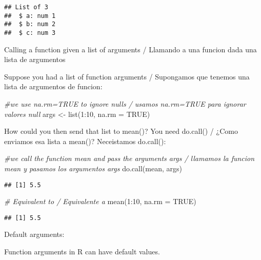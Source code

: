 \documentclass[
]{article}
\newenvironment{Shaded}{\begin{snugshade}}{\end{snugshade}}
\newcommand{\AttributeTok}[1]{\textcolor[rgb]{0.77,0.63,0.00}{#1}}
\newcommand{\CommentTok}[1]{\textcolor[rgb]{0.56,0.35,0.01}{\textit{#1}}}
\newcommand{\ConstantTok}[1]{\textcolor[rgb]{0.00,0.00,0.00}{#1}}
\newcommand{\DecValTok}[1]{\textcolor[rgb]{0.00,0.00,0.81}{#1}}
\newcommand{\FunctionTok}[1]{\textcolor[rgb]{0.00,0.00,0.00}{#1}}
\newcommand{\NormalTok}[1]{#1}
\newcommand{\OtherTok}[1]{\textcolor[rgb]{0.56,0.35,0.01}{#1}}
\newcommand{\SpecialCharTok}[1]{\textcolor[rgb]{0.00,0.00,0.00}{#1}}
\begin{document}
\begin{verbatim}
## List of 3
##  $ a: num 1
##  $ b: num 2
##  $ c: num 3
\end{verbatim}

Calling a function given a list of arguments / Llamando a una funcion
dada una lista de argumentos

Suppose you had a list of function arguments / Supongamos que tenemos
una lista de argumentos de funcion:

\begin{Shaded}
\begin{Highlighting}[]
\CommentTok{\#we use na.rm=TRUE to ignore nulls / usamos na.rm=TRUE para ignorar valores null}
\NormalTok{args }\OtherTok{\textless{}{-}} \FunctionTok{list}\NormalTok{(}\DecValTok{1}\SpecialCharTok{:}\DecValTok{10}\NormalTok{, }\AttributeTok{na.rm =} \ConstantTok{TRUE}\NormalTok{)}
\end{Highlighting}
\end{Shaded}

How could you then send that list to mean()? You need do.call() / ¿Como
enviamos esa lista a mean()? Neceistamos do.call():

\begin{Shaded}
\begin{Highlighting}[]
\CommentTok{\#we call the function mean and pass the arguments args / llamamos la funcion mean y pasamos los argumentos args}
\FunctionTok{do.call}\NormalTok{(mean, args)}
\end{Highlighting}
\end{Shaded}

\begin{verbatim}
## [1] 5.5
\end{verbatim}

\begin{Shaded}
\begin{Highlighting}[]
\CommentTok{\# Equivalent to / Equivalente a}
\FunctionTok{mean}\NormalTok{(}\DecValTok{1}\SpecialCharTok{:}\DecValTok{10}\NormalTok{, }\AttributeTok{na.rm =} \ConstantTok{TRUE}\NormalTok{)}
\end{Highlighting}
\end{Shaded}

\begin{verbatim}
## [1] 5.5
\end{verbatim}

Default arguments:

Function arguments in R can have default values.
\end{document}
